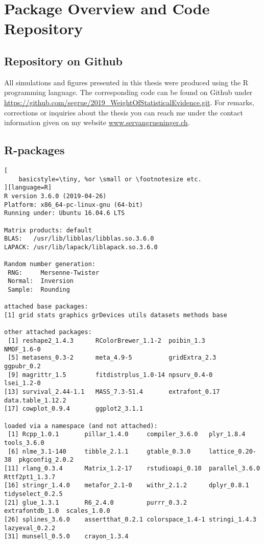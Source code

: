 \chapter{Package Overview and Code Repository}
\label{cha:appendix}
\section{Repository on Github}
All simulations and figures presented in this thesis were produced using the \textsf{R} programming language. The corresponding code can be found on Github under \href{https://github.com/segrue/2019_WeightOfStatisticalEvidence.git}{https://github.com/segrue/2019\_WeightOfStatisticalEvidence.git}. For remarks, corrections or inquiries about the thesis you can reach me under the contact information given on my website \href{www.servangrueninger.ch}{www.servangrueninger.ch}.\newpage

\section{\textsf{R}-packages}
\begin{lstlisting}[
    basicstyle=\tiny, %or \small or \footnotesize etc.
][language=R]
R version 3.6.0 (2019-04-26)
Platform: x86_64-pc-linux-gnu (64-bit)
Running under: Ubuntu 16.04.6 LTS

Matrix products: default
BLAS:   /usr/lib/libblas/libblas.so.3.6.0
LAPACK: /usr/lib/lapack/liblapack.so.3.6.0

Random number generation:
 RNG:     Mersenne-Twister 
 Normal:  Inversion 
 Sample:  Rounding 
 
attached base packages:
[1] grid stats graphics grDevices utils datasets methods base     

other attached packages:
 [1] reshape2_1.4.3      RColorBrewer_1.1-2  poibin_1.3          NMOF_1.6-0         
 [5] metasens_0.3-2      meta_4.9-5          gridExtra_2.3       ggpubr_0.2         
 [9] magrittr_1.5        fitdistrplus_1.0-14 npsurv_0.4-0        lsei_1.2-0         
[13] survival_2.44-1.1   MASS_7.3-51.4       extrafont_0.17      data.table_1.12.2  
[17] cowplot_0.9.4       ggplot2_3.1.1      

loaded via a namespace (and not attached):
 [1] Rcpp_1.0.1       pillar_1.4.0     compiler_3.6.0   plyr_1.8.4       tools_3.6.0     
 [6] nlme_3.1-140     tibble_2.1.1     gtable_0.3.0     lattice_0.20-38  pkgconfig_2.0.2 
[11] rlang_0.3.4      Matrix_1.2-17    rstudioapi_0.10  parallel_3.6.0   Rttf2pt1_1.3.7  
[16] stringr_1.4.0    metafor_2.1-0    withr_2.1.2      dplyr_0.8.1      tidyselect_0.2.5
[21] glue_1.3.1       R6_2.4.0         purrr_0.3.2      extrafontdb_1.0  scales_1.0.0    
[26] splines_3.6.0    assertthat_0.2.1 colorspace_1.4-1 stringi_1.4.3    lazyeval_0.2.2  
[31] munsell_0.5.0    crayon_1.3.4

\end{lstlisting}




